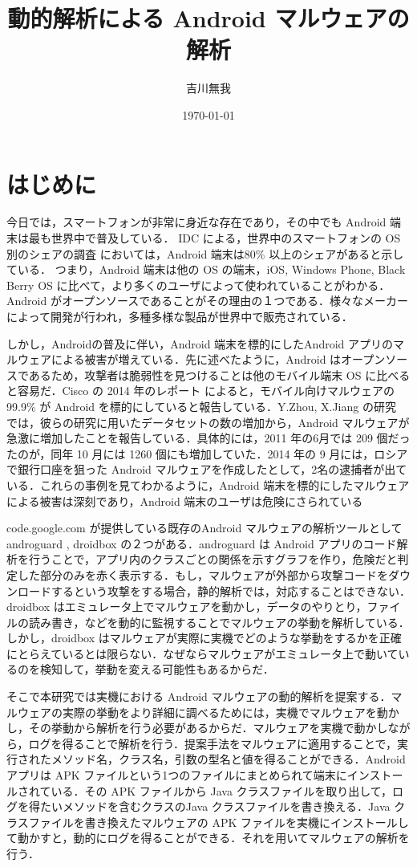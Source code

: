 \documentclass[12pt]{jsarticle}
\title{動的解析による Android マルウェアの解析}
\author{吉川無我}
\date{\today}
\begin{document}
\maketitle
\newpage
\tableofcontents


\newpage
\section{はじめに}
今日では，スマートフォンが非常に身近な存在であり，その中でも Android 端末は最も世界中で普及している． IDC による，世界中のスマートフォンの OS 別のシェアの調査 \cite{osshare} においては，Android 端末は80\% 以上のシェアがあると示している． つまり，Android 端末は他の OS の端末，iOS, Windows Phone, Black Berry OS に比べて，より多くのユーザによって使われていることがわかる．Android がオープンソースであることがその理由の１つである．様々なメーカーによって開発が行われ，多種多様な製品が世界中で販売されている．

しかし，Androidの普及に伴い，Android 端末を標的にしたAndroid アプリのマルウェアによる被害が増えている．先に述べたように，Android はオープンソースであるため，攻撃者は脆弱性を見つけることは他のモバイル端末 OS に比べると容易だ．Cisco の 2014 年のレポート \cite{cisco} によると，モバイル向けマルウェアの 99.9\% が Android を標的にしていると報告している．Y.Zhou, X.Jiang の研究 \cite{dissect} では，彼らの研究に用いたデータセットの数の増加から，Android マルウェアが急激に増加したことを報告している．具体的には，2011 年の6月では 209 個だったのが，同年 10 月には 1260 個にも増加していた．2014 年の 9 月には，ロシアで銀行口座を狙った Android マルウェアを作成したとして，2名の逮捕者が出ている．これらの事例を見てわかるように，Android 端末を標的にしたマルウェアによる被害は深刻であり，Android 端末のユーザは危険にさられている

code.google.com が提供している既存のAndroid マルウェアの解析ツールとして androguard \cite{aguard} , droidbox \cite{dbox} の２つがある．androguard は Android アプリのコード解析を行うことで，アプリ内のクラスごとの関係を示すグラフを作り，危険だと判定した部分のみを赤く表示する．もし，マルウェアが外部から攻撃コードをダウンロードするという攻撃をする場合，静的解析では，対応することはできない．droidbox はエミュレータ上でマルウェアを動かし，データのやりとり，ファイルの読み書き，などを動的に監視することでマルウェアの挙動を解析している．しかし，droidbox はマルウェアが実際に実機でどのような挙動をするかを正確にとらえているとは限らない．なぜならマルウェアがエミュレータ上で動いているのを検知して，挙動を変える可能性もあるからだ．

そこで本研究では実機における Android マルウェアの動的解析を提案する．マルウェアの実際の挙動をより詳細に調べるためには，実機でマルウェアを動かし，その挙動から解析を行う必要があるからだ．マルウェアを実機で動かしながら，ログを得ることで解析を行う．提案手法をマルウェアに適用することで，実行されたメソッド名，クラス名，引数の型名と値を得ることができる．Android アプリは APK ファイルという1つのファイルにまとめられて端末にインストールされている．その APK ファイルから Java クラスファイルを取り出して，ログを得たいメソッドを含むクラスのJava クラスファイルを書き換える．Java クラスファイルを書き換えたマルウェアの APK ファイルを実機にインストールして動かすと，動的にログを得ることができる．それを用いてマルウェアの解析を行う．
\end{document}
